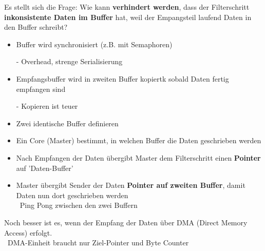 \vspace{0.1cm}

Es stellt sich die Frage: Wie kann \textbf{verhindert werden}, dass der Filterschritt \textbf{inkonsistente Daten im Buffer} hat, weil der
Empangsteil laufend Daten in den Buffer schreibt?

\vspace{0.2cm}

\begin{minipage}[t]{0.45\columnwidth}

    \begin{itemize}
        \item Buffer wird synchronisiert (z.B. mit Semaphoren)
        \item[-] Overhead, strenge Serialisierung
    \end{itemize}
\end{minipage}
\hfill
\begin{minipage}[t]{0.52\columnwidth}

    \begin{itemize}
        \item Empfangsbuffer wird in zweiten Buffer kopiertk sobald Daten fertig empfangen sind
        \item[-] Kopieren ist teuer
    \end{itemize}
\end{minipage}



\begin{itemize}
    \item Zwei identische Buffer definieren
    \item Ein Core (Master) bestimmt, in welchen Buffer die Daten geschrieben werden
    \item Nach Empfangen der Daten übergibt Master dem Filterschritt einen \textbf{Pointer} auf 'Daten-Buffer'
    \item Master übergibt Sender der Daten \textbf{Pointer auf zweiten Buffer}, damit Daten nun dort geschrieben werden \\
        \textrightarrow\ Ping Pong zwischen den zwei Buffern
\end{itemize}

\vspace{0.1cm}

Noch besser ist es, wenn der Empfang der Daten über DMA (Direct Memory Access) erfolgt. \\
\textrightarrow\ DMA-Einheit braucht nur Ziel-Pointer und Byte Counter

